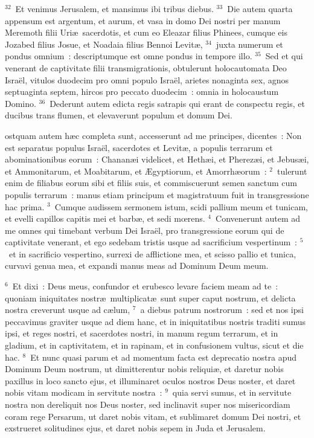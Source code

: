 ${}^{32}$~Et venimus Jerusalem, et mansimus ibi tribus diebus.
${}^{33}$~Die autem quarta appensum est argentum, et aurum, et vasa in domo Dei nostri per manum Meremoth filii Uri\ae\ sacerdotis, et cum eo Eleazar filius Phinees, cumque eis Jozabed filius Josue, et Noadaia filius Bennoi Levit\ae ,
${}^{34}$~juxta numerum et pondus omnium~: descriptumque est omne pondus in tempore illo.
${}^{35}$~Sed et qui venerant de captivitate filii transmigrationis, obtulerunt holocautomata Deo Isra\"el, vitulos duodecim pro omni populo Isra\"el, arietes nonaginta sex, agnos septuaginta septem, hircos pro peccato duodecim~: omnia in holocaustum Domino.
${}^{36}$~Dederunt autem edicta regis satrapis qui erant de conspectu regis, et ducibus trans flumen, et elevaverunt populum et domum Dei.

\bchapter
{}ostquam autem h\ae c completa sunt, accesserunt ad me principes, dicentes~: Non est separatus populus Isra\"el, sacerdotes et Levit\ae , a populis terrarum et abominationibus eorum~: Chanan\ae i videlicet, et Heth\ae i, et Pherez\ae i, et Jebus\ae i, et Ammonitarum, et Moabitarum, et \AE gyptiorum, et Amorrh\ae orum~:
${}^{2}$~tulerunt enim de filiabus eorum sibi et filiis suis, et commiscuerunt semen sanctum cum populis terrarum~: manus etiam principum et magistratuum fuit in transgressione hac prima.
${}^{3}$~Cumque audissem sermonem istum, scidi pallium meum et tunicam, et evelli capillos capitis mei et barb\ae , et sedi mœrens.
${}^{4}$~Convenerunt autem ad me omnes qui timebant verbum Dei Isra\"el, pro transgressione eorum qui de captivitate venerant, et ego sedebam tristis usque ad sacrificium vespertinum~:
${}^{5}$~et in sacrificio vespertino, surrexi de afflictione mea, et scisso pallio et tunica, curvavi genua mea, et expandi manus meas ad Dominum Deum meum.


${}^{6}$~Et dixi~: Deus meus, confundor et erubesco levare faciem meam ad te~: quoniam iniquitates nostr\ae\ multiplicat\ae\ sunt super caput nostrum, et delicta nostra creverunt usque ad c\ae lum,
${}^{7}$~a diebus patrum nostrorum~: sed et nos ipsi peccavimus graviter usque ad diem hanc, et in iniquitatibus nostris traditi sumus ipsi, et reges nostri, et sacerdotes nostri, in manum regum terrarum, et in gladium, et in captivitatem, et in rapinam, et in confusionem vultus, sicut et die hac.
${}^{8}$~Et nunc quasi parum et ad momentum facta est deprecatio nostra apud Dominum Deum nostrum, ut dimitterentur nobis reliqui\ae , et daretur nobis paxillus in loco sancto ejus, et illuminaret oculos nostros Deus noster, et daret nobis vitam modicam in servitute nostra~:
${}^{9}$~quia servi sumus, et in servitute nostra non dereliquit nos Deus noster, sed inclinavit super nos misericordiam coram rege Persarum, ut daret nobis vitam, et sublimaret domum Dei nostri, et exstrueret solitudines ejus, et daret nobis sepem in Juda et Jerusalem.


